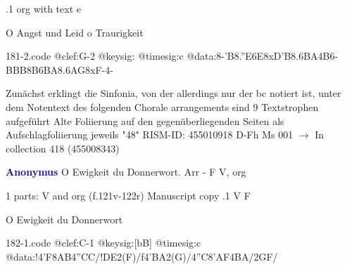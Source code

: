 \documentclass[twocolumn]{book}
\begin{document}
.1  org with text  e
\newline \begin{footnotesize} O Angst und Leid o Traurigkeit \end{footnotesize}  
\begin{filecontents*}{181-2.code}
@clef:G-2
@keysig:
@timesig:c
@data:8-{'B8.''E6E}{8xD'B8.6BA}4B6-{BBB}{8B6BA8.6AG}8xF-4-
\end{filecontents*}
\newline
%

\newline Zunächst erklingt die Sinfonia, von der allerdings nur der bc notiert ist, unter dem Notentext des folgenden Chorale arrangements sind 9 Textstrophen aufgeführt
\newline Alte Foliierung auf den gegenüberliegenden Seiten als Aufschlagfoliierung jeweils "48"
\newline RISM-ID: 455010918
\newline D-Fh  Ms 001
\newline $\rightarrow$ In collection 418 (455008343)
      
\newline \par \vspace{7pt} \textcolor{darkblue}{\textbf{Anonymus  }}
\newline O Ewigkeit du Donnerwort. Arr - F
\newline V, org
\newline \begin{itshape}\end{itshape} 
\newline \textcolor{darkblue}{}  1 parts: V and org  (f.121v-122r)
\newline Manuscript copy
.1  V  F
\newline \begin{footnotesize} O Ewigkeit du Donnerwort \end{footnotesize}  
\begin{filecontents*}{182-1.code}
@clef:C-1
@keysig:[bB]
@timesig:c
@data:!4'F8AB4''CC/!DE2(F)/f4'BA2(G)/4''C8'AF4BA/2GF/
\end{filecontents*}
\newline
%
\end{document}
